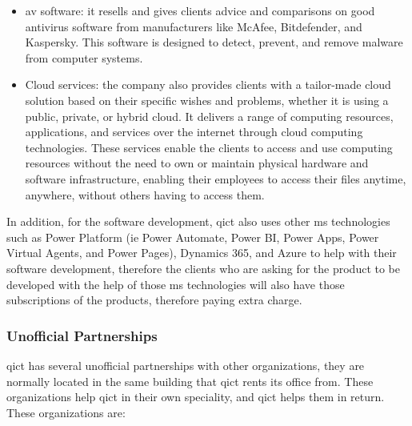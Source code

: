 \begin{multicols}{2}
\begin{itemize}
            \item \acrshort{av} software: it resells and gives clients advice and comparisons on good antivirus software from manufacturers like
                  McAfee, Bitdefender, and Kaspersky. This software is designed to detect, prevent, and remove malware from computer systems.
            \item Cloud services: the company also provides clients with a tailor-made cloud solution based on their specific wishes and
                  problems, whether it is using a public, private, or hybrid cloud. It delivers a range of computing resources, applications,
                  and services over the internet through cloud computing technologies. These services enable the clients to access and use
                  computing resources without the need to own or maintain physical hardware and software infrastructure, enabling their
                  employees to access their files anytime, anywhere, without others having to access them.
      \end{itemize}

      In addition, for the software development, \acrshort{qict} also uses other \acrshort{ms} technologies such as Power Platform
      (\acrshort{ie} Power Automate, Power BI, Power Apps, Power Virtual Agents, and Power Pages), Dynamics 365, and Azure to help with their
      software development, therefore the clients who are asking for the product to be developed with the help of  those \acrshort{ms}
      technologies will also have those subscriptions of the products, therefore paying extra charge.



      \subsubsection{Unofficial Partnerships}

      \acrshort{qict} has several unofficial partnerships with other organizations, they are normally located in the same building that
      \acrshort{qict} rents its office from. These organizations help \acrshort{qict} in their own speciality, and \acrshort{qict} helps them
      in return. These organizations are:


\end{multicols}
